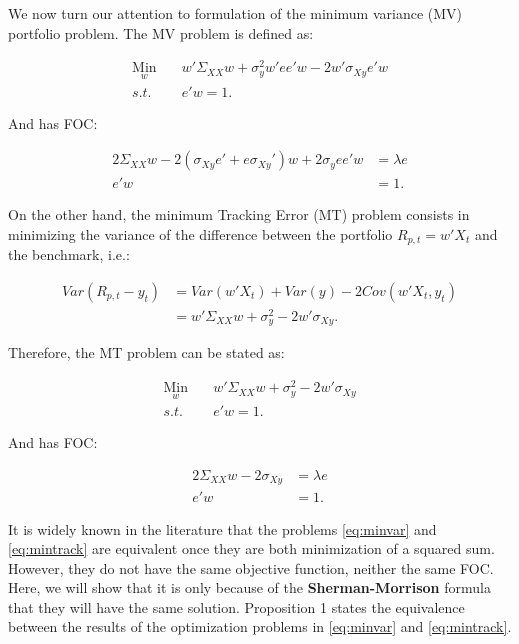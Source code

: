 \documentclass[12pt,oneside,a4paper]{memoir}
\begin{document}
We now turn our attention to formulation of the minimum variance (MV) portfolio problem. The MV problem is defined as:

\begin{align}\label{eq:minvar}
\underset{w}{\text{Min}} \quad &
w'\Sigma_{XX}w + \sigma^{2}_{y}w'ee'w - 2w'\sigma_{Xy}e'w
\\
s.t. \quad &
e'w = 1.\nonumber
\end{align}

\noindent
And has FOC:

\begin{align*}
	2 \Sigma_{XX} w - 2(\sigma_{Xy}e' + e \sigma_{Xy}')w + 2 \sigma_{y}ee'w &= \lambda e
\\
e'w &= 1.
\end{align*}


On the other hand, the minimum Tracking Error (MT) problem consists in minimizing the variance of the difference between the portfolio $R_{p,t}=w'X_{t}$ and the benchmark, i.e.:

\begin{align*}
Var(R_{p,t} - y_{t}) 
&= Var(w'X_{t}) + Var(y) - 2Cov(w'X_{t}, y_{t})
\\
&= w'\Sigma_{XX}w + \sigma_{y}^{2} - 2w'\sigma_{Xy}.
\end{align*}

\noindent
Therefore, the MT problem can be stated as:

\begin{align}\label{eq:mintrack}
\underset{w}{\text{Min}} \quad & w'\Sigma_{XX}w + \sigma_{y}^{2} - 2w'\sigma_{Xy} 
\\
s.t. \quad &
e'w = 1. \nonumber
\end{align}

\noindent
And has FOC:

\begin{align*}
2 \Sigma_{XX} w - 2 \sigma_{Xy} &= \lambda e
\\
e'w &= 1.
\end{align*}

It is widely known in the literature \cite{ckl99, liu-2009, brodie2009, demol2016} that the problems \eqref{eq:minvar} and \eqref{eq:mintrack} are equivalent once they are both minimization of a squared sum.
However, they do not have the same objective function, neither the same FOC.
Here, we will show that it is only because of the \textbf{Sherman-Morrison} formula \cite{matcook2012} that they will have the same solution.
Proposition 1 states the equivalence between the results of the optimization problems in \eqref{eq:minvar} and \eqref{eq:mintrack}.\\
\end{document}

